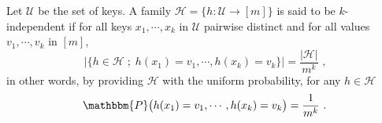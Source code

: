 \begin{definition}\label{def:k-independent-hashing}
Let $\mathcal U$ be the set of keys. A family $\mathcal H = \big\{ h : \mathcal
U \rightarrow [m]\big\}$ is said to be $k$-independent if for all keys $x_1,
\cdots, x_k$ in $\mathcal U$ pairwise distinct and for all values $v_1, \cdots,
v_k$ in $[m]$,
\begin{equation*}
    \big| \{ h \in \mathcal H \; ;\; h(x_1)=v_1, \cdots,  h(x_k)=v_k \} \big| =
    \frac{|\mathcal H |}{m^k} \text{ ,}
\end{equation*}
in other words, by providing $\mathcal H$ with the uniform probability, for any
$h\in \mathcal H$
\begin{equation*}
    \mathbbm{P}\big(h(x_1)=v_1, \cdots,  h(x_k)=v_k \big) = \frac{1}{m^k} \text{ .}
\end{equation*}
\end{definition}


